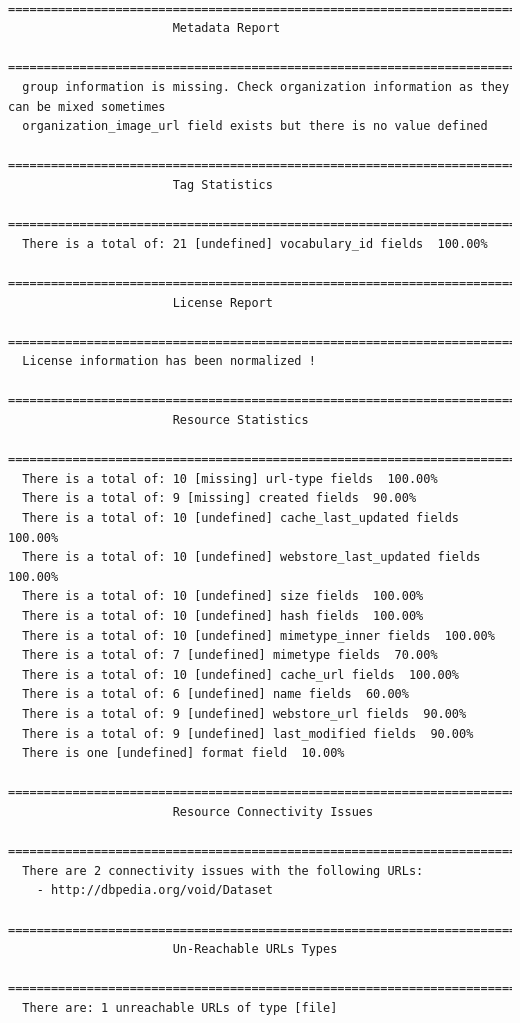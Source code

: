 \documentclass[runningheads,a4paper]{llncs}
\begin{document}
\begin{lstlisting}
 =======================================================================
                       Metadata Report
 =======================================================================
  group information is missing. Check organization information as they can be mixed sometimes
  organization_image_url field exists but there is no value defined
 =======================================================================
                       Tag Statistics
 =======================================================================
  There is a total of: 21 [undefined] vocabulary_id fields  100.00%
 =======================================================================
                       License Report
 =======================================================================
  License information has been normalized !
 =======================================================================
                       Resource Statistics
 =======================================================================
  There is a total of: 10 [missing] url-type fields  100.00%
  There is a total of: 9 [missing] created fields  90.00%
  There is a total of: 10 [undefined] cache_last_updated fields  100.00%
  There is a total of: 10 [undefined] webstore_last_updated fields  100.00%
  There is a total of: 10 [undefined] size fields  100.00%
  There is a total of: 10 [undefined] hash fields  100.00%
  There is a total of: 10 [undefined] mimetype_inner fields  100.00%
  There is a total of: 7 [undefined] mimetype fields  70.00%
  There is a total of: 10 [undefined] cache_url fields  100.00%
  There is a total of: 6 [undefined] name fields  60.00%
  There is a total of: 9 [undefined] webstore_url fields  90.00%
  There is a total of: 9 [undefined] last_modified fields  90.00%
  There is one [undefined] format field  10.00%
 =======================================================================
                       Resource Connectivity Issues
 =======================================================================
  There are 2 connectivity issues with the following URLs:
    - http://dbpedia.org/void/Dataset
 =======================================================================
                       Un-Reachable URLs Types
 =======================================================================
  There are: 1 unreachable URLs of type [file]
\end{lstlisting}
\end{document}
